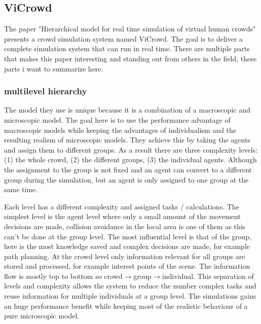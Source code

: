 \documentclass{acmsiggraph}               %
\begin{document}
\subsection{ViCrowd}

The paper "Hierarchical model for real time simulation of virtual human crowds" \cite{musse_hierarchical_2001} presents a crowd simulation system named ViCrowd. 
The goal is to deliver a complete simulation system that can run in real time. 
There are multiple parts that makes this paper interesting and standing out from others in the field, these parts i want to summarize here. 

\subsubsection{multilevel hierarchy}
The model they use is unique because it is a combination of a macroscopic and microscopic model. The goal here is to use the performance advantage of macroscopic models while keeping the advantages of individualism and the resulting realism of microscopic models.
They achieve this by taking the agents and assign them to different groups. As a result there are three complexity levels: (1) the whole crowd, (2) the different groups, (3) the individual agents. Although the assignment to the group is not fixed and an agent can convert to a different group during the simulation, but an agent is only assigned to one group at the same time.

Each level has a different complexity and assigned tasks / calculations. 
The simplest level is the agent level where only a small amount of the movement decisions are made, collision avoidance in the local area is one of them as this can't be done at the group level.
The most influential level is that of the group, here is the most knowledge saved and complex decisions are made, for example path planning.
At the crowd level only information relevant for all groups are stored and processed, for example interest points of the scene.
The information flow is mostly top to bottom so crowd$\rightarrow$group$\rightarrow$individual.
This separation of levels and complexity allows the system to reduce the number complex tasks and reuse information for multiple individuals at a group level. The simulations gains an huge performance benefit while keeping most of the realistic behaviour of a pure microscopic model. 
\end{document}
